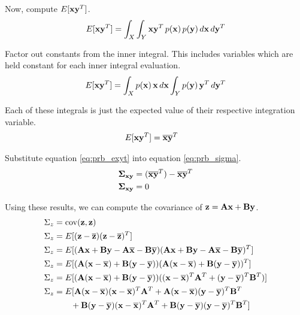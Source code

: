 Now, compute $E[\mathbf{x}\mathbf{y}^T]$.
\begin{equation*}
  E[\mathbf{x}\mathbf{y}^T] = \int_X \int_Y \mathbf{x}\mathbf{y}^T \,p(\mathbf{x})
    \,p(\mathbf{y}) \,d\mathbf{x} \,d\mathbf{y}^T
\end{equation*}

Factor out constants from the inner integral. This includes variables which are
held constant for each inner integral evaluation.
\begin{equation*}
  E[\mathbf{x}\mathbf{y}^T] = \int_X p(\mathbf{x}) \,\mathbf{x} \,d\mathbf{x}
    \int_Y p(\mathbf{y}) \,\mathbf{y}^T \,d\mathbf{y}^T
\end{equation*}

Each of these integrals is just the expected value of their respective
integration variable.
\begin{align}
  E[\mathbf{x}\mathbf{y}^T] &= \overline{\mathbf{x}}\overline{\mathbf{y}}^T \label{eq:prb_exyt}
\end{align}

Substitute equation \eqref{eq:prb_exyt} into equation \eqref{eq:prb_sigma}.
\begin{align*}
  \mathbf{\Sigma}_{\mathbf{x}\mathbf{y}} &= (\overline{\mathbf{x}}\overline{\mathbf{y}}^T) -
    \overline{\mathbf{x}}\overline{\mathbf{y}}^T \\
  \mathbf{\Sigma}_{\mathbf{x}\mathbf{y}} &= 0
\end{align*}

Using these results, we can compute the covariance of
$\mathbf{z} = \mathbf{A}\mathbf{x} + \mathbf{B}\mathbf{y}$.
\begin{align*}
  \Sigma_z &= \operatorname{cov}(\mathbf{z}, \mathbf{z}) \\
  \Sigma_z &= E[(\mathbf{z} - \overline{\mathbf{z}})(\mathbf{z} - \overline{\mathbf{z}})^T] \\
  \Sigma_z &= E[(\mathbf{A}\mathbf{x} + \mathbf{B}\mathbf{y} - \mathbf{A}\overline{\mathbf{x}} -
    \mathbf{B}\overline{\mathbf{y}})(\mathbf{A}\mathbf{x} + \mathbf{B}\mathbf{y} -
    \mathbf{A}\overline{\mathbf{x}} - \mathbf{B}\overline{\mathbf{y}})^T] \\
  \Sigma_z &= E[(\mathbf{A}(\mathbf{x} - \overline{\mathbf{x}}) +
    \mathbf{B}(\mathbf{y} - \overline{\mathbf{y}}))
    (\mathbf{A}(\mathbf{x} - \overline{\mathbf{x}}) +
     \mathbf{B}(\mathbf{y} - \overline{\mathbf{y}}))^T] \\
  \Sigma_z &= E[(\mathbf{A}(\mathbf{x} - \overline{\mathbf{x}}) +
    \mathbf{B}(\mathbf{y} - \overline{\mathbf{y}}))
    ((\mathbf{x} - \overline{\mathbf{x}})^T\mathbf{A}^T +
     (\mathbf{y} - \overline{\mathbf{y}})^T\mathbf{B}^T)] \\
  \Sigma_z &= E[
    \mathbf{A}(\mathbf{x} - \overline{\mathbf{x}})(\mathbf{x} - \overline{\mathbf{x}})^T\mathbf{A}^T +
    \mathbf{A}(\mathbf{x} - \overline{\mathbf{x}})(\mathbf{y} - \overline{\mathbf{y}})^T\mathbf{B}^T \\
    &\qquad + \mathbf{B}(\mathbf{y} - \overline{\mathbf{y}})(\mathbf{x} - \overline{\mathbf{x}})^T\mathbf{A}^T +
    \mathbf{B}(\mathbf{y} - \overline{\mathbf{y}})(\mathbf{y} - \overline{\mathbf{y}})^T\mathbf{B}^T]
\end{align*}

